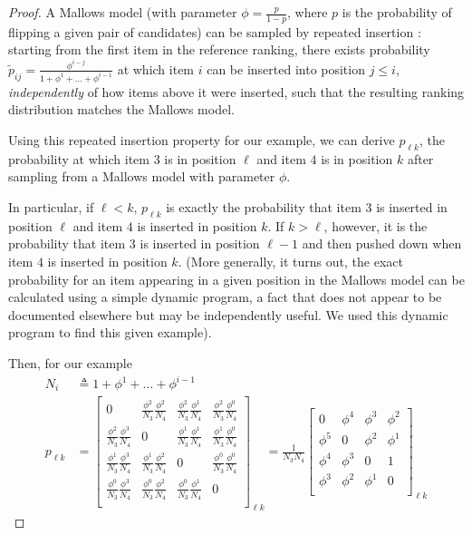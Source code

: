 \documentclass[10pt]{article}
\begin{document}
\begin{ReviewVerbatim}
\begin{proof}
A Mallows model (with parameter $\phi = \frac{p}{1-p}$, where $p$ is the probability of flipping a given pair of candidates) can be sampled by repeated insertion \citep{lu14a,diaconis_group_nodate}: starting from the first item in the reference ranking, there exists probability $\tilde{p}_{ij} = \frac{\phi^{i-j}}{1 + \phi^1 + \dots + \phi^{i-1}}$ at which item $i$ can be inserted into position $j\leq i$, \textit{independently} of how items above it were inserted, such that the resulting ranking distribution matches the Mallows model.

Using this repeated insertion property for our example, we can derive $p_{\ell k}$, the probability at which item $3$ is in position $\ell$ and item $4$ is in position $k$ after sampling from a Mallows model with parameter $\phi$.

In particular, if $\ell < k$, $p_{\ell k}$ is exactly the probability that item $3$ is inserted in position $\ell$ and item $4$ is inserted in position $k$. If $k>\ell$, however, it is the probability that item $3$ is inserted in position $\ell - 1$ and then pushed down when item $4$ is inserted in position $k$. (More generally, it turns out, the exact probability for an item appearing in a given position in the Mallows model can be calculated using a simple dynamic program, a fact that does not appear to be documented  elsewhere but may be independently useful. We used this dynamic program to find this given example).

Then, for our example
\begin{align*}
N_i &\triangleq 1 + \phi^1 + \dots + \phi^{i-1} \\
p_{\ell k} &= \begin{bmatrix}
0 & \frac{\phi^2}{N_3}\frac{\phi^2}{N_4} & \frac{\phi^2}{N_3}\frac{\phi^1}{N_4} & \frac{\phi^2}{N_3}\frac{\phi^0}{N_4}\\
\frac{\phi^2}{N_3}\frac{\phi^3}{N_4} & 0 & \frac{\phi^1}{N_3}\frac{\phi^1}{N_4} & \frac{\phi^1}{N_3}\frac{\phi^0}{N_4}\\
\frac{\phi^1}{N_3}\frac{\phi^3}{N_4} & \frac{\phi^1}{N_3}\frac{\phi^2}{N_4} & 0 & \frac{\phi^0}{N_3}\frac{\phi^0}{N_4}\\
\frac{\phi^0}{N_3}\frac{\phi^3}{N_4} & \frac{\phi^0}{N_3}\frac{\phi^2}{N_4} & \frac{\phi^0}{N_3}\frac{\phi^1}{N_4} & 0\\
\end{bmatrix}_{\ell k}
=
\frac{1}{N_3N_4}\begin{bmatrix}
0 & \phi^4 & \phi^3 & {\phi^2}\\
\phi^5 & 0 & \phi^2 & {\phi^1}\\
\phi^4 & \phi^3 & 0 & 1\\
{\phi^3} & {\phi^2} & {\phi^1} & 0\\
\end{bmatrix}_{\ell k}
\end{align*}


\end{proof}
\end{ReviewVerbatim}
\end{document}
